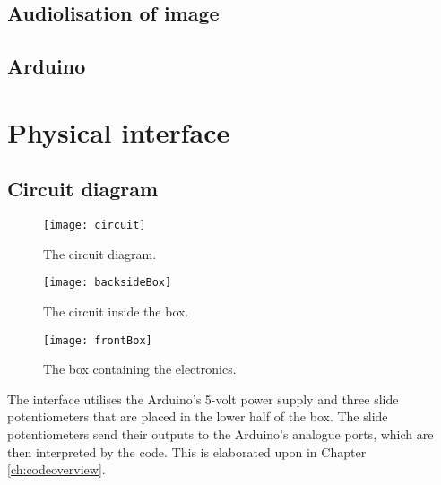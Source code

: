 	\subsection{Audiolisation of image}\label{sub:audiolisationofimage} 
	
	\subsection{Arduino}\label{sub:arduino}
	
\section{Physical interface}\label{sec:physicalinterface}

	
	\subsection{Circuit diagram}\label{sub:circuitdiagram}
\begin{figure}
\centering
\texttt{[image: circuit]}
\caption{The circuit diagram.}
\label{fig:circuit}
\end{figure}

\begin{figure}
\centering
\texttt{[image: backsideBox]}
\caption{The circuit inside the box.}
\label{fig:backsideBox}
\end{figure}

\begin{figure}
\centering
\texttt{[image: frontBox]}
\caption{The box containing the electronics.}
\label{fig:frontBox}
\end{figure}

	
	The interface utilises the Arduino's 5-volt power supply and three slide potentiometers that are placed in the lower half of the box. The slide potentiometers send their outputs to the Arduino's analogue ports, which are then interpreted by the code. This is elaborated upon in Chapter \ref{ch:codeoverview}.
